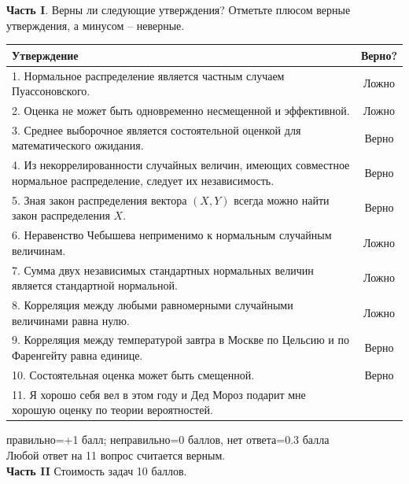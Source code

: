 \documentclass[12pt, a4paper]{article}\usepackage[]{graphicx}\usepackage[]{color}
\begin{document}
\textbf{Часть I}. Верны ли следующие утверждения? Отметьте плюсом верные утверждения, а минусом -- неверные. \\

\renewcommand\arraystretch{2.0}

\begin{tabular}{|p{15cm}|c|}
\hline
Утверждение & Верно? \\
\hline
1. Нормальное распределение является частным случаем Пуассоновского.  &  Ложно \\
\hline
2. Оценка не может быть одновременно несмещенной и эффективной. &  Ложно \\
\hline
3. Среднее выборочное является состоятельной оценкой для математического ожидания. &  Верно \\
\hline
4. Из некоррелированности случайных величин, имеющих совместное нормальное распределение,  следует их независимость. &  Верно \\
\hline
5. Зная закон распределения вектора $(X,Y)$ всегда можно найти закон распределения $X$. &  Верно \\
\hline
6. Неравенство Чебышева неприменимо к нормальным случайным величинам. & Ложно \\
\hline
7. Сумма двух независимых стандартных нормальных величин является стандартной нормальной. & Ложно \\
\hline
8. Корреляция между любыми равномерными случайными величинами равна нулю. &  Ложно \\
\hline
9. Корреляция между температурой завтра в Москве по Цельсию и по Фаренгейту равна единице. &  Верно \\
\hline
10. Состоятельная оценка может быть смещенной. &  Верно \\
\hline
11. Я хорошо себя вел в этом году и Дед Мороз подарит мне хорошую оценку по теории вероятностей. &  \\
\hline
\end{tabular}

правильно=+1 балл; неправильно=0 баллов, нет ответа=0.3 балла \\
Любой ответ на 11 вопрос считается верным. \\

\textbf{Часть II} Стоимость задач 10 баллов. \\
\end{document}
